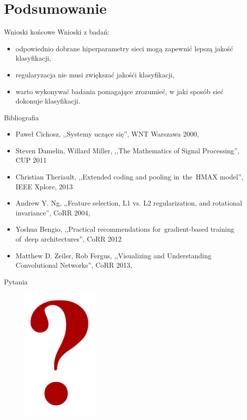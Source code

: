 \documentclass[xcolor=dvipsnames]{beamer}
\begin{document}
\section{Podsumowanie}
\begin{frame}{Wnioski końcowe}
  Wnioski z badań:
  \begin{itemize}
    \item odpowiednio dobrane hiperparametry sieci mogą zapewnić lepszą jakość klasyfikacji,
    \item regularyzacja nie musi zwiększać jakośći klasyfikacji,
    \item warto wykonywać badania pomagające zrozumieć, w jaki sposób sieć dokonuje klasyfikacji.
  \end{itemize}
\end{frame}
\begin{frame}{Bibliografia}
	\begin{itemize}
		\item Paweł Cichosz, ,,Systemy uczące się'', WNT Warszawa 2000,
		\item Steven Damelin, Willard Miller, ,,The Mathematics of Signal Processing'', CUP 2011
		\item Christian Theriault, ,,Extended coding and pooling in~the~HMAX model'', IEEE Xplore, 2013
		\item Andrew Y. Ng, ,,Feature selection, L1 vs. L2 regularization, and rotational invariance'', CoRR 2004,
		\item Yoshua Bengio, ,,Practical recommendations for~gradient-based training of~deep architectures'', CoRR 2012
		\item Matthew D. Zeiler, Rob Fergus, ,,Visualizing and Understanding Convolutional Networks'', CoRR 2013,
	\end{itemize}
\end{frame}

\begin{frame}{Pytania}
  \begin{figure}
    \includegraphics[width=0.35\textwidth]{img/question-mark-red.png}
  \end{figure}
\end{frame}
\end{document}
